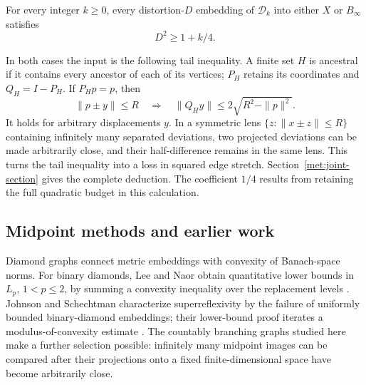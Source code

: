 \begin{theorem}\label{met:intro-main}\label{met:joint-distortion}
For every integer $k\ge0$, every distortion-$D$ embedding of
$\mathcal D_k$ into either $X$ or $B_\infty$ satisfies
\[
 D^2\ge1+k/4.
\]
\end{theorem}

In both cases the input is the following tail inequality. A finite set
$H$ is ancestral if it contains every ancestor of each of its vertices;
$P_H$ retains its coordinates and $Q_H=I-P_H$. If $P_Hp=p$, then
\[
 \|p\pm y\|\le R
 \quad\Longrightarrow\quad
 \|Q_Hy\|\le2\sqrt{R^2-\|p\|^2}.
\]
It holds for arbitrary displacements $y$. In a symmetric lens
$\{z:\|x\pm z\|\le R\}$ containing infinitely many separated deviations,
two projected deviations can be made arbitrarily close, and their
half-difference remains in the same lens. This turns the tail inequality
into a loss in squared edge stretch. Section~\ref{met:joint-section}
gives the complete deduction. The coefficient $1/4$ results from retaining the full quadratic budget
in this calculation.

\subsection{Midpoint methods and earlier work}
Diamond graphs connect metric embeddings with convexity of Banach-space
norms. For binary diamonds, Lee and Naor obtain
quantitative lower bounds in $L_p$, $1<p\le2$, by summing a convexity
inequality over the replacement levels \cite[Lemma~2.2]{LeeNaor2004}.
Johnson and Schechtman characterize superreflexivity by the failure of
uniformly bounded binary-diamond embeddings; their lower-bound proof
iterates a modulus-of-convexity estimate
\cite[Section~4]{JohnsonSchechtman2009}. The countably branching graphs
studied here make a further selection possible: infinitely many midpoint
images can be compared after their projections onto a fixed
finite-dimensional space have become arbitrarily close.

